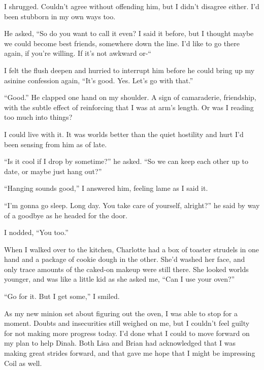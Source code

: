 I shrugged.  Couldn't agree without offending him, but I didn't disagree either.   I'd been stubborn in my own ways too.



He asked, ``So do you want to call it even?  I said it before, but I thought maybe we could become best friends, somewhere down the line.  I'd like to go there again, if you're willing.  If it's not awkward or-``



I felt the flush deepen and hurried to interrupt him before he could bring up my asinine confession again, ``It's good.  Yes.  Let's go with that.''



``Good.''  He clapped one hand on my shoulder.  A sign of camaraderie, friendship, with the subtle effect of reinforcing that I was at arm's length.  Or was I reading too much into things?



I could live with it.  It was worlds better than the quiet hostility and hurt I'd been sensing from him as of late.



``Is it cool if I drop by sometime?'' he asked.  ``So we can keep each other up to date, or maybe just hang out?''



``Hanging sounds good,'' I answered him, feeling lame as I said it.



``I'm gonna go sleep.  Long day.  You take care of yourself, alright?'' he said by way of a goodbye as he headed for the door.



I nodded, ``You too.''



When I walked over to the kitchen, Charlotte had a box of toaster strudels in one hand and a package of cookie dough in the other.  She'd washed her face, and only trace amounts of the caked-on makeup were still there.  She looked worlds younger, and was like a little kid as she asked me, ``Can I use your oven?''



``Go for it.  But I get some,'' I smiled.



As my new minion set about figuring out the oven, I was able to stop for a moment.  Doubts and insecurities still weighed on me, but I couldn't feel guilty for not making more progress today.  I'd done what I could to move forward on my plan to help Dinah.  Both Lisa and Brian had acknowledged that I was making great strides forward, and that gave me hope that I might be impressing Coil as well.



